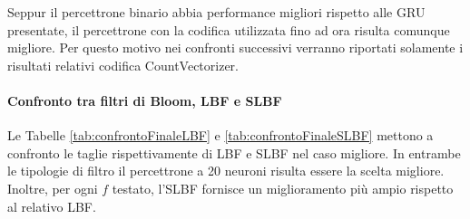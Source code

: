 \documentclass[../../main.tex]{subfiles}
\begin{document}
    Seppur il percettrone binario abbia performance migliori rispetto alle GRU presentate, il percettrone con la codifica utilizzata fino ad ora risulta comunque migliore. Per questo motivo nei confronti successivi verranno riportati solamente i risultati relativi codifica CountVectorizer.


    \paragraph{Confronto tra filtri di Bloom, LBF e SLBF}
    Le Tabelle \ref{tab:confrontoFinaleLBF} e \ref{tab:confrontoFinaleSLBF} mettono a confronto le taglie rispettivamente di LBF e SLBF nel caso migliore. In entrambe le tipologie di filtro il percettrone a 20 neuroni risulta essere la scelta migliore. Inoltre, per ogni $f$ testato, l'SLBF fornisce un miglioramento più ampio rispetto al relativo LBF.
    
\end{document}
